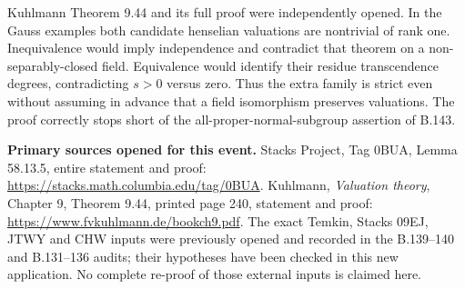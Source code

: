 Kuhlmann Theorem 9.44 and its full proof
were independently opened.  In the Gauss
examples both candidate henselian valuations
are nontrivial of rank one.  Inequivalence
would imply independence and contradict that
theorem on a non-separably-closed field.
Equivalence would identify their residue
transcendence degrees, contradicting $s>0$
versus zero.  Thus the extra family is
strict even without assuming in advance
that a field isomorphism preserves valuations.
The proof correctly stops short of the
all-proper-normal-subgroup assertion of B.143.

\medskip\noindent\textbf{Primary sources opened for this event.}
Stacks Project, Tag 0BUA, Lemma 58.13.5,
entire statement and proof:
\url{https://stacks.math.columbia.edu/tag/0BUA}.
Kuhlmann, \emph{Valuation theory}, Chapter 9,
Theorem 9.44, printed page 240, statement
and proof:
\url{https://www.fvkuhlmann.de/bookch9.pdf}.
The exact Temkin, Stacks 09EJ, JTWY and CHW
inputs were previously opened and recorded
in the B.139--140 and B.131--136 audits;
their hypotheses have been checked in this
new application.  No complete re-proof of
those external inputs is claimed here.
